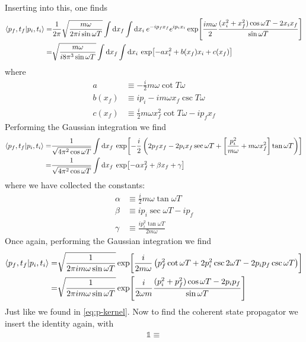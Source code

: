 \documentclass[a4paper,11pt]{article}
\begin{document}
Inserting into this, one finds
\begin{equation}
\begin{aligned}
\braket{p_f,t_f}{p_i,t_i}=&\frac{1}{2\pi}\sqrt{\frac{m\omega}{2\pi i \sin{\omega T}}}\int\dd x_f \int  \dd x_i \: e^{-ip_fx_f} e^{ip_ix_i} \exp[\frac{i m \omega}{2 }\frac{(x_i^2+x_f^2)\cos{\omega T}-2x_i x_f}{\sin{\omega T}}]\\
=&\sqrt{\frac{m\omega}{i 8\pi^3 \sin{\omega T}}}\int\dd x_f\int  \dd x_i \: \exp[-ax_i^2+b(x_f)x_i+c(x_f)]
\end{aligned}
\end{equation}
where 
\begin{equation}
\begin{aligned}
a&\equiv-\frac{i}{2}m\omega \cot{T \omega}\\
b(x_f)&\equiv ip_i-im\omega x_f \csc{T\omega}\\
c(x_f)&\equiv\frac{i}{2}m\omega x_f^2 \cot{T\omega}-ip_f x_f
\end{aligned}
\end{equation}
Performing the Gaussian integration we find
\begin{equation}
\begin{aligned}
\braket{p_f,t_f}{p_i,t_i}=&\frac{1}{\sqrt{4\pi^2\cos{\omega T}}}
\int\dd x_f \: \exp[-\frac{i}{2 }
\left(2p_fx_f-2p_ix_f\sec{\omega T}+\left[\frac{p_i^2}{m\omega}+m\omega x_f^2\right]\tan{\omega T}\right)
]\\
=&
\frac{1}{\sqrt{4\pi^2\cos{\omega T}}}
\int\dd x_f \: \exp[-\alpha x_f^2+\beta x_f+\gamma]
\end{aligned}
\end{equation}
where we have collected the constants:
\begin{equation}
\begin{aligned}
\alpha&\equiv\frac{i}{2}m\omega \tan{\omega T}\\
\beta&\equiv ip_i\sec{\omega T} -ip_f\\
\gamma&\equiv \frac{ip_i^2\tan{\omega T}}{2m\omega}
\end{aligned}
\end{equation}
Once again, performing the Gaussian integration we find
\begin{equation}
	\begin{aligned}
		\braket{p_f,t_f}{p_i,t_i}=&\sqrt{\frac{1}{2\pi im\omega \sin{\omega T}}}\exp[\frac{i}{2m\omega}\left(p_f^2\cot{\omega T}+2p_i^2\csc{2\omega T}-2p_ip_f\csc{\omega T}\right)]\\
		=&
		\sqrt{\frac{1}{2\pi im\omega \sin{\omega T}}}\exp[\frac{i}{2\omega m }\frac{(p_i^2+p_f^2)\cos{\omega T}-2p_i p_f}{\sin{\omega T}}]
	\end{aligned}
\end{equation}
Just like we found in \eqref{eq:p-kernel}.
Now to find the coherent state propagator we insert the identity again, with
\begin{equation}
\begin{aligned}
\mathds{1}\equiv
\end{aligned}
\end{equation}
\newpage
\end{document}
